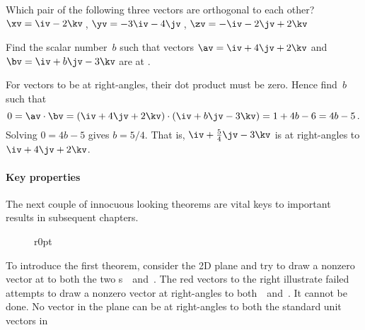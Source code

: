 \begin{activity}
Which pair of the following three vectors are orthogonal to each other?
\(\xv=\iv-2\kv\)\,, \(\yv=-3\iv-4\jv\)\,, \(\zv=-\iv-2\jv+2\kv\)
\end{activity}



\begin{reduce}
\begin{example} 
Find the scalar number~\(b\) such that vectors \(\av=\iv+4\jv+2\kv\) and \(\bv=\iv+b\jv-3\kv\) are at .
\begin{solution} 
For vectors to be at right-angles, their dot product must be zero.
Hence find~\(b\) such that
\begin{equation*}
0=\av\cdot\bv=(\iv+4\jv+2\kv)\cdot(\iv+b\jv-3\kv)
=1+4b-6=4b-5\,.
\end{equation*}
Solving \(0=4b-5\) gives \(b=5/4\).
That is, \(\iv+\tfrac54\jv-3\kv\) is at right-angles to \(\iv+4\jv+2\kv\).
\end{solution}
\end{example}
\end{reduce}



\paragraph{Key properties}
The next couple of innocuous looking theorems are vital keys to important results in subsequent chapters.

%
\begin{wrapfigure}r{0pt}
\end{wrapfigure}
To introduce the first theorem, consider the 2D plane and try to draw a nonzero vector at  to both the two s~\iv\ and~\jv.
The red vectors to the right illustrate failed attempts to draw a nonzero vector at right-angles to both~\iv\ and~\jv.
It cannot be done. 
No vector in the plane can be at right-angles to both the standard unit vectors in 


